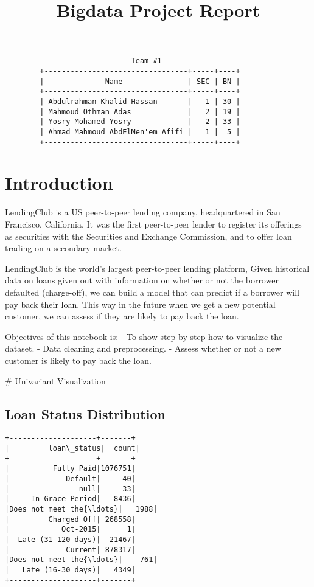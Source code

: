 \documentclass[11pt]{article}
\title{{\Huge Bigdata Project Report}}
\author{}
\begin{document}
    
    \maketitle

    {\Large 
    \begin{center}
        \begin{verbatim}
                             Team #1
        +---------------------------------+-----+----+
        |              Name               | SEC | BN |
        +---------------------------------+-----+----+
        | Abdulrahman Khalid Hassan       |   1 | 30 |
        | Mahmoud Othman Adas             |   2 | 19 |
        | Yosry Mohamed Yosry             |   2 | 33 |
        | Ahmad Mahmoud AbdElMen'em Afifi |   1 |  5 |
        +---------------------------------+-----+----+
        \end{verbatim}
    \end{center}
    }
    
    \section{Introduction}

LendingClub is a US peer-to-peer lending company, headquartered in San Francisco, California.
It was the first peer-to-peer lender to register its offerings as securities with the Securities and Exchange Commission,
and to offer loan trading on a secondary market.

LendingClub is the world's largest peer-to-peer lending platform, Given historical data on loans given out with information on whether or not the borrower defaulted (charge-off), we can build a model that can predict if a borrower will pay back their loan.
This way in the future when we get a new potential customer, we can assess if they are likely to pay back the loan.

Objectives of this notebook is: - To show step-by-step how to visualize
the dataset. - Data cleaning and preprocessing. - Assess whether or not
a new customer is likely to pay back the loan.

    \# Univariant Visualization

    \hypertarget{loan-status-distribution}{%
\subsection{Loan Status Distribution}\label{loan-status-distribution}}

    \begin{Verbatim}[commandchars=\\\{\}]
+--------------------+-------+
|         loan\_status|  count|
+--------------------+-------+
|          Fully Paid|1076751|
|             Default|     40|
|                null|     33|
|     In Grace Period|   8436|
|Does not meet the{\ldots}|   1988|
|         Charged Off| 268558|
|            Oct-2015|      1|
|  Late (31-120 days)|  21467|
|             Current| 878317|
|Does not meet the{\ldots}|    761|
|   Late (16-30 days)|   4349|
+--------------------+-------+

    \end{Verbatim}
\end{document}
